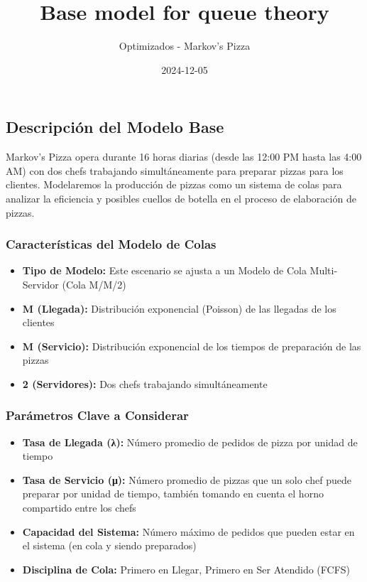 \documentclass[
]{article}
\title{Base model for queue theory}
\author{Optimizados - Markov's Pizza}
\date{2024-12-05}
\providecommand{\tightlist}{%
  \setlength{\itemsep}{0pt}\setlength{\parskip}{0pt}}
\begin{document}
\maketitle

\subsection{Descripción del Modelo
Base}\label{descripciuxf3n-del-modelo-base}

Markov's Pizza opera durante 16 horas diarias (desde las 12:00 PM hasta
las 4:00 AM) con dos chefs trabajando simultáneamente para preparar
pizzas para los clientes. Modelaremos la producción de pizzas como un
sistema de colas para analizar la eficiencia y posibles cuellos de
botella en el proceso de elaboración de pizzas.

\subsubsection{Características del Modelo de
Colas}\label{caracteruxedsticas-del-modelo-de-colas}

\begin{itemize}
\tightlist
\item
  \textbf{Tipo de Modelo:} Este escenario se ajusta a un Modelo de Cola
  Multi-Servidor (Cola M/M/2)
\item
  \textbf{M (Llegada):} Distribución exponencial (Poisson) de las
  llegadas de los clientes
\item
  \textbf{M (Servicio):} Distribución exponencial de los tiempos de
  preparación de las pizzas
\item
  \textbf{2 (Servidores):} Dos chefs trabajando simultáneamente
\end{itemize}

\subsubsection{Parámetros Clave a
Considerar}\label{paruxe1metros-clave-a-considerar}

\begin{itemize}
\tightlist
\item
  \textbf{Tasa de Llegada (λ):} Número promedio de pedidos de pizza por
  unidad de tiempo
\item
  \textbf{Tasa de Servicio (μ):} Número promedio de pizzas que un solo
  chef puede preparar por unidad de tiempo, también tomando en cuenta el
  horno compartido entre los chefs
\item
  \textbf{Capacidad del Sistema:} Número máximo de pedidos que pueden
  estar en el sistema (en cola y siendo preparados)
\item
  \textbf{Disciplina de Cola:} Primero en Llegar, Primero en Ser
  Atendido (FCFS)
\end{itemize}
\end{document}

